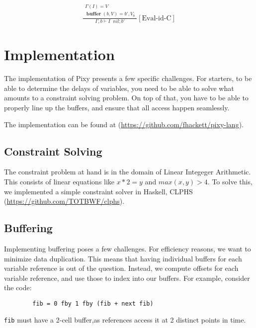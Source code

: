 \documentclass{scrartcl}
\DeclareMathOperator{\ceval}{\overset{C}{\rightarrow}}
\DeclareMathOperator{\buffer}{\mathbf{buffer}}
\begin{document}
    \begin{align*}
    \frac{
        \begin{matrix}
        \Gamma(I) = V \\
        \buffer(b, V) = b', V_b
        \end{matrix}
    }{
        \Gamma, b \vdash I \ceval nil; b'
    }[\text{Eval-id-C}]
    \end{align*}
    
    \section{Implementation}
    
    The implementation of Pixy presents a few specific challenges. For starters, 
    to be able to determine the delays of variables, you need to be able to 
    solve what amounts to a constraint solving problem. On top of that, you
    have to be able to properly line up the buffers, and ensure that all access happen seamlessly.

    The implementation can be found at (\url{https://github.com/fhackett/pixy-lang}).

    \subsection{Constraint Solving}
    The constraint problem at hand is in the domain of Linear Integeger Arithmetic. This consists
    of linear equations like $x * 2 = y$ and $max(x,y) > 4$. To solve this, we implemented a 
    simple constraint solver in Haskell, CLPHS (\url{https://github.com/TOTBWF/clphs}).

    \subsection{Buffering}
    Implementing buffering poses a few challenges. For efficiency reasons, we want to minimize data duplication.
    This means that having individual buffers for each variable reference is out of the question. Instead, we compute
    offsets for each variable reference, and use those to index into our buffers. For example, consider the code:
    \begin{lstlisting}
        fib = 0 fby 1 fby (fib + next fib)
    \end{lstlisting}
    \lstinline{fib} must have a 2-cell buffer,as references access it at 2 distinct points in time.
\end{document}
